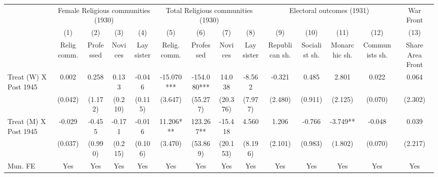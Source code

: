 {
\def\sym#1{\ifmmode^{#1}\else\(^{#1}\)\fi}
\begin{tabular}{l*{13}{c}}
\hline\hline
                    &\multicolumn{4}{c}{Female Religious communities (1930)}        &\multicolumn{4}{c}{Total Religious communities (1930)}         &\multicolumn{4}{c}{Electoral outcomes (1931)}                  &\multicolumn{1}{c}{War Front}\\\cmidrule(lr){2-5}\cmidrule(lr){6-9}\cmidrule(lr){10-13}\cmidrule(lr){14-14}
                    &\multicolumn{1}{c}{(1)}&\multicolumn{1}{c}{(2)}&\multicolumn{1}{c}{(3)}&\multicolumn{1}{c}{(4)}&\multicolumn{1}{c}{(5)}&\multicolumn{1}{c}{(6)}&\multicolumn{1}{c}{(7)}&\multicolumn{1}{c}{(8)}&\multicolumn{1}{c}{(9)}&\multicolumn{1}{c}{(10)}&\multicolumn{1}{c}{(11)}&\multicolumn{1}{c}{(12)}&\multicolumn{1}{c}{(13)}\\
                    &\multicolumn{1}{c}{Relig comm.}&\multicolumn{1}{c}{Professed}&\multicolumn{1}{c}{Novices}&\multicolumn{1}{c}{Lay sister}&\multicolumn{1}{c}{Relig. comm.}&\multicolumn{1}{c}{Professed}&\multicolumn{1}{c}{Novices}&\multicolumn{1}{c}{Lay sister}&\multicolumn{1}{c}{Republican sh.}&\multicolumn{1}{c}{Socialist sh.}&\multicolumn{1}{c}{Monarchic sh.}&\multicolumn{1}{c}{Communists sh.}&\multicolumn{1}{c}{Share Area Front}\\
\hline
Treat (W) X Post 1945&       0.002   &       0.258   &       0.133   &      -0.046   &     -15.070***&    -154.080***&      14.038   &      -8.562   &      -0.321   &       0.485   &       2.801   &       0.022   &       0.064   \\
                    &     (0.042)   &     (1.172)   &     (0.210)   &     (0.115)   &     (3.647)   &    (55.277)   &    (20.376)   &     (7.977)   &     (2.480)   &     (0.911)   &     (2.125)   &     (0.070)   &     (2.302)   \\
Treat (M) X Post 1945&      -0.029   &      -0.455   &      -0.171   &      -0.016   &      11.206***&     123.267** &     -15.418   &       4.560   &       1.206   &      -0.766   &      -3.749** &      -0.048   &       0.039   \\
                    &     (0.037)   &     (0.990)   &     (0.215)   &     (0.106)   &     (3.470)   &    (53.869)   &    (20.153)   &     (8.196)   &     (2.101)   &     (0.983)   &     (1.802)   &     (0.070)   &     (2.217)   \\
Mun. FE             &         Yes   &         Yes   &         Yes   &         Yes   &         Yes   &         Yes   &         Yes   &         Yes   &         Yes   &         Yes   &         Yes   &         Yes   &         Yes   \\

\end{tabular}}
